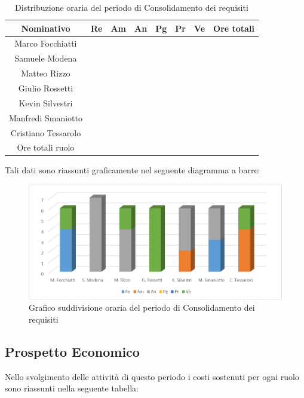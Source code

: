 \documentclass[./PianodiProgetto.tex]{subfiles}
\begin{document}
\begin{table}[H]
	\centering
	\begin{tabular}{|c|cccccc|c|}
		\hline
		Nominativo&Re&Am&An&Pg&Pr&Ve&Ore totali\\ \hline
		Marco Focchiatti& & & & & & & \\ \hline
		Samuele Modena& & & & & & & \\ \hline
		Matteo Rizzo& & & & & & & \\ \hline
		Giulio Rossetti& & & & & & & \\ \hline
		Kevin Silvestri& & & & & & & \\ \hline
		Manfredi Smaniotto& & & & & & & \\ \hline
		Cristiano Tessarolo& & & & & & & \\  \hline
		Ore totali ruolo& & & & & & & \\ \hline
	\end{tabular}
	\caption{Distribuzione oraria del periodo di Consolidamento dei requisiti}
\end{table}

Tali dati sono riassunti graficamente nel seguente diagramma a barre:
\begin{figure}[H]
	\centering
	\includegraphics[width=1\linewidth]{img/grafici/ConsolidamentoRequisitiProspettoOrario}
	\caption{Grafico suddivisione oraria del periodo di Consolidamento dei requisiti}
	\label{fig:consolidamento-requisiti-prospetto-orario}
\end{figure}

\subsection{Prospetto Economico}
Nello svolgimento delle attività di questo periodo i costi sostenuti per ogni ruolo sono riassunti nella seguente tabella:
\end{document}
